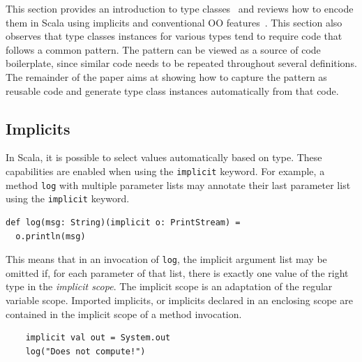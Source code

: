 \documentclass[preprint,nocopyrightspace]{sigplanconf}
\newcommand{\term}[1]{\mbox{\texttt{#1}}}
\begin{document}
This section provides an introduction to type classes~\cite{WadlerTypeClasses} and
reviews how to encode them in Scala using implicits and conventional
OO features~\cite{Oliveira2010}.  This section also observes that type
classes instances for various types tend to require code that follows
a common pattern. The pattern can be viewed as a source of code
boilerplate, since similar code needs to be repeated throughout several
definitions. The remainder of the paper aims at showing how
to capture the pattern as reusable code and generate type class
instances automatically from that code.


%
%

\subsection{Implicits}
\label{sec:implicits}

In Scala, it is possible to select values
automatically based on type. These capabilities are enabled when using the
\term{implicit} keyword. For example, a method \term{log} with multiple
parameter lists may annotate their last parameter list using the
\term{implicit} keyword.%

\begin{lstlisting}
def log(msg: String)(implicit o: PrintStream) =
  o.println(msg)
\end{lstlisting}

This means that in an invocation of \term{log}, the implicit argument list may
be omitted if, for each parameter of that list, there is exactly one value of
the right type in the {\em implicit scope}. The implicit scope is an
adaptation of the regular variable scope. Imported implicits, or implicits
declared in an enclosing scope are contained in the implicit scope of a method
invocation.

\begin{lstlisting}
    implicit val out = System.out
    log("Does not compute!")
\end{lstlisting}
\end{document}
